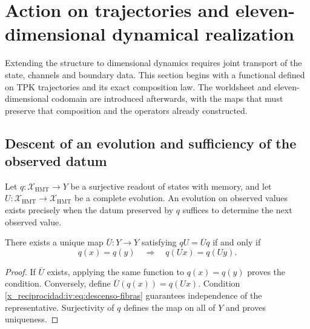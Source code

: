 \section{Action on trajectories and eleven-dimensional dynamical realization}
\label{x_reciprocidad:iv:accion-realizacion}

Extending the structure to dimensional dynamics requires
joint transport of the state, channels and boundary
data. This section begins with a functional defined on
TPK trajectories and its exact composition law.
The worldsheet and eleven-dimensional codomain are
introduced afterwards, with the maps that must preserve that
composition and the operators already constructed.

\subsection{Descent of an evolution and sufficiency of the observed datum}

Let \(q:\mathcal X_{\mathrm{HMT}}\to Y\) be a surjective
readout of states with memory, and let
\(U:\mathcal X_{\mathrm{HMT}}\to\mathcal X_{\mathrm{HMT}}\)
be a complete evolution. An evolution on observed
values exists precisely when the datum preserved by
\(q\) suffices to determine the next observed value.

\begin{theorem}
\label{x_reciprocidad:iv:thm:descenso-fibras}
There exists a unique map \(\overline U:Y\to Y\)
satisfying \(qU=\overline Uq\) if and only if
\begin{equation}
 q(x)=q(y)\quad\Longrightarrow\quad q(Ux)=q(Uy).
 \label{x_reciprocidad:iv:eq:descenso-fibras}
\end{equation}
\end{theorem}
\begin{proof}
If \(\overline U\) exists, applying the same function to
\(q(x)=q(y)\) proves the condition. Conversely,
define \(\overline U(q(x))=q(Ux)\). Condition
\eqref{x_reciprocidad:iv:eq:descenso-fibras} guarantees independence of the
representative. Surjectivity of \(q\) defines the
map on all of \(Y\) and proves uniqueness.
\end{proof}

